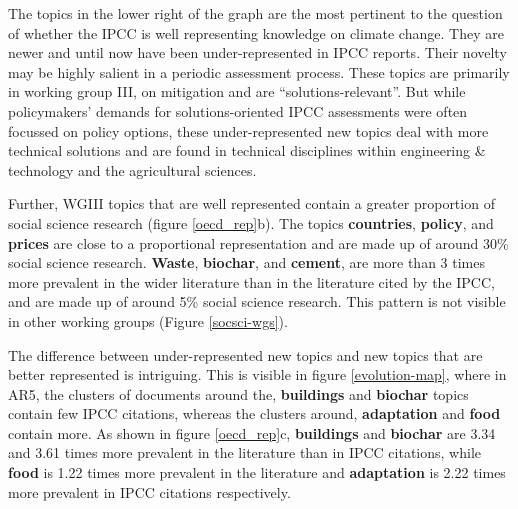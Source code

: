 \documentclass{article}
\begin{document}
\begin{linenumbers}
		The topics in the lower right of the graph are the most pertinent to the question of whether the IPCC is well representing knowledge on climate change. They are newer and until now have been under-represented in IPCC reports. Their novelty may be highly salient in a periodic assessment process. These topics are primarily in working group III, on mitigation and are ``solutions-relevant''. But while policymakers' demands for solutions-oriented IPCC assessments were often focussed on policy options, these under-represented new topics deal with more technical solutions and are found in technical disciplines within engineering \& technology and the agricultural sciences.
		
		Further, WGIII topics that are well represented contain a greater proportion of social science research (figure \ref{oecd_rep}b). The topics \textbf{countries}, \textbf{policy}, and \textbf{prices} are close to a proportional representation and are made up of around 30\% social science research. \textbf{Waste}, \textbf{biochar}, and \textbf{cement}, are more than 3 times more prevalent in the wider literature than in the literature cited by the IPCC, and are made up of around 5\% social science research. This pattern is not visible in other working groups (Figure \ref{socsci-wgs}).
		
		The difference between under-represented new topics and new topics that are better represented is intriguing. This is visible in figure \ref{evolution-map}, where in AR5, the clusters of documents around the, \textbf{buildings} and \textbf{biochar} topics contain few IPCC citations, whereas the clusters around, \textbf{adaptation} and \textbf{food} contain more. As shown in figure \ref{oecd_rep}c, \textbf{buildings} and \textbf{biochar} are 3.34 and 3.61 times more prevalent in the literature than in IPCC citations, while \textbf{food} is 1.22 times more prevalent in the literature and \textbf{adaptation} is 2.22 times more prevalent in IPCC citations respectively. %
		

		


\end{linenumbers}
\end{document}
